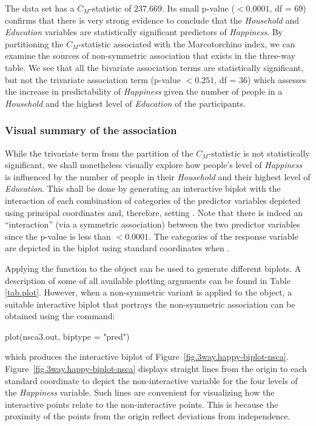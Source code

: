 The data set  has a $C_M$-statistic of $237.669$. Its small p-value ($<0.0001$, df = 69) confirms that there is very strong evidence to conclude that the {\it Household} and {\it Education} variables are statistically significant predictors of {\it Happiness}. By partitioning the $C_M$-statistic associated with the Marcotorchino index, we can examine the sources of non-symmetric association that exists in the three-way table. We see that all the bivariate association terms are statistically significant, but not the trivariate association term  (p-value $<0.251$, df = 36) which assesses the increase in predictability of {\it Happiness} given the number of people in a {\it Household} and the highest level of {\it Education} of the participants. 

\subsubsection{Visual summary of the association}

While the trivariate  term from the partition of the $C_M$-statistic is not statistically significant, we shall nonetheless visually explore how people's level of {\it Happiness} is influenced by the number of people in their {\it Household}  and their highest level of {\it Education}. This shall be done by generating an interactive biplot with the interaction of each combination of categories of the predictor variables depicted using principal coordinates and, therefore, setting . Note that there is indeed an ``interaction'' (via a symmetric association) between the two predictor variables since the  p-value is less than $<0.0001$. The categories of the response variable are depicted in the biplot using standard coordinates when .

Applying the  function to the  object  can be used to generate different biplots. A description of some of all available plotting arguments can be found in Table \ref{tab.plot}. However, when a non-symmetric variant is applied to the  object, a suitable interactive biplot that portrays the non-symmetric association can be obtained using the command:
		
\begin{example}
plot(nsca3.out, biptype = "pred")
\end{example}
which produces the interactive biplot of Figure~\ref{fig.3way.happy-biplot-nsca}. 
Figure~\ref{fig.3way.happy-biplot-nsca} displays  straight lines from the origin to each standard coordinate to depict the non-interactive variable  for the four levels of the {\it Happiness} variable. Such lines are convenient for visualizing how the interactive points relate to the non-interactive points. This is because the proximity of the points from the origin reflect deviations from independence.


